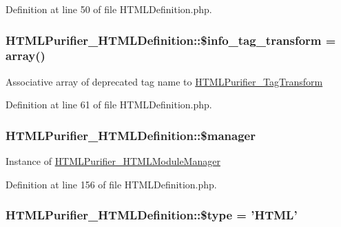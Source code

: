 Definition at line 50 of file H\+T\+M\+L\+Definition.\+php.

\hypertarget{classHTMLPurifier__HTMLDefinition_aef7624e8f0a8dde1e5358ec9bfaefc7c}{
\subsubsection[{\$info\+\_\+tag\+\_\+transform}]{\setlength{\rightskip}{0pt plus 5cm}H\+T\+M\+L\+Purifier\+\_\+\+H\+T\+M\+L\+Definition\+::\$info\+\_\+tag\+\_\+transform = array()}}\label{classHTMLPurifier__HTMLDefinition_aef7624e8f0a8dde1e5358ec9bfaefc7c}
Associative array of deprecated tag name to \hyperlink{classHTMLPurifier__TagTransform}{H\+T\+M\+L\+Purifier\+\_\+\+Tag\+Transform} 

Definition at line 61 of file H\+T\+M\+L\+Definition.\+php.

\hypertarget{classHTMLPurifier__HTMLDefinition_a7d12dbd6f3c9e01dc952a86c4b9e09ef}{
\subsubsection[{\$manager}]{\setlength{\rightskip}{0pt plus 5cm}H\+T\+M\+L\+Purifier\+\_\+\+H\+T\+M\+L\+Definition\+::\$manager}}\label{classHTMLPurifier__HTMLDefinition_a7d12dbd6f3c9e01dc952a86c4b9e09ef}
Instance of \hyperlink{classHTMLPurifier__HTMLModuleManager}{H\+T\+M\+L\+Purifier\+\_\+\+H\+T\+M\+L\+Module\+Manager} 

Definition at line 156 of file H\+T\+M\+L\+Definition.\+php.

\hypertarget{classHTMLPurifier__HTMLDefinition_a45e0d16c16636c45f2fbdfa556ec9294}{
\subsubsection[{\$type}]{\setlength{\rightskip}{0pt plus 5cm}H\+T\+M\+L\+Purifier\+\_\+\+H\+T\+M\+L\+Definition\+::\$type = 'H\+T\+M\+L'}}\label{classHTMLPurifier__HTMLDefinition_a45e0d16c16636c45f2fbdfa556ec9294}


